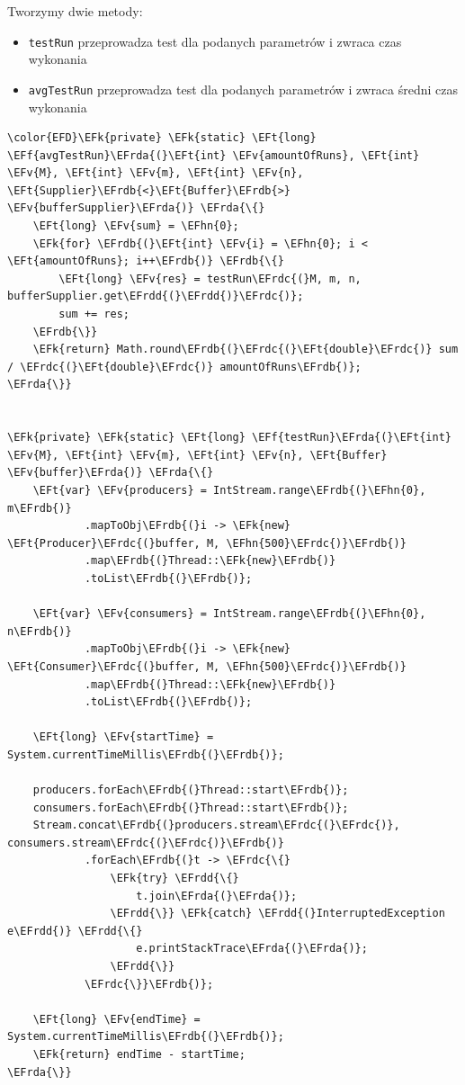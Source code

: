 \documentclass[11pt]{article}
\newcommand{\EFk}[1]{\textcolor{EFk}{#1}} %
\newcommand{\EFf}[1]{\textcolor{EFf}{#1}} %
\newcommand{\EFv}[1]{\textcolor{EFv}{#1}} %
\newcommand{\EFt}[1]{\textcolor{EFt}{#1}} %
\newcommand{\EFhn}[1]{\textcolor{EFhn}{#1}} %
\newcommand{\EFrda}[1]{#1} %
\newcommand{\EFrdb}[1]{\textcolor{EFrdb}{#1}} %
\newcommand{\EFrdc}[1]{\textcolor{EFrdc}{#1}} %
\newcommand{\EFrdd}[1]{\textcolor{EFrdd}{#1}} %
\begin{document}
Tworzymy dwie metody:
\begin{itemize}
\item \texttt{testRun} przeprowadza test dla podanych parametrów i zwraca czas wykonania
\item \texttt{avgTestRun} przeprowadza test dla podanych parametrów i zwraca średni czas wykonania
\end{itemize}

\begin{Code}
\begin{Verbatim}
\color{EFD}\EFk{private} \EFk{static} \EFt{long} \EFf{avgTestRun}\EFrda{(}\EFt{int} \EFv{amountOfRuns}, \EFt{int} \EFv{M}, \EFt{int} \EFv{m}, \EFt{int} \EFv{n}, \EFt{Supplier}\EFrdb{<}\EFt{Buffer}\EFrdb{>} \EFv{bufferSupplier}\EFrda{)} \EFrda{\{}
    \EFt{long} \EFv{sum} = \EFhn{0};
    \EFk{for} \EFrdb{(}\EFt{int} \EFv{i} = \EFhn{0}; i < \EFt{amountOfRuns}; i++\EFrdb{)} \EFrdb{\{}
        \EFt{long} \EFv{res} = testRun\EFrdc{(}M, m, n, bufferSupplier.get\EFrdd{(}\EFrdd{)}\EFrdc{)};
        sum += res;
    \EFrdb{\}}
    \EFk{return} Math.round\EFrdb{(}\EFrdc{(}\EFt{double}\EFrdc{)} sum / \EFrdc{(}\EFt{double}\EFrdc{)} amountOfRuns\EFrdb{)};
\EFrda{\}}


\EFk{private} \EFk{static} \EFt{long} \EFf{testRun}\EFrda{(}\EFt{int} \EFv{M}, \EFt{int} \EFv{m}, \EFt{int} \EFv{n}, \EFt{Buffer} \EFv{buffer}\EFrda{)} \EFrda{\{}
    \EFt{var} \EFv{producers} = IntStream.range\EFrdb{(}\EFhn{0}, m\EFrdb{)}
            .mapToObj\EFrdb{(}i -> \EFk{new} \EFt{Producer}\EFrdc{(}buffer, M, \EFhn{500}\EFrdc{)}\EFrdb{)}
            .map\EFrdb{(}Thread::\EFk{new}\EFrdb{)}
            .toList\EFrdb{(}\EFrdb{)};

    \EFt{var} \EFv{consumers} = IntStream.range\EFrdb{(}\EFhn{0}, n\EFrdb{)}
            .mapToObj\EFrdb{(}i -> \EFk{new} \EFt{Consumer}\EFrdc{(}buffer, M, \EFhn{500}\EFrdc{)}\EFrdb{)}
            .map\EFrdb{(}Thread::\EFk{new}\EFrdb{)}
            .toList\EFrdb{(}\EFrdb{)};

    \EFt{long} \EFv{startTime} = System.currentTimeMillis\EFrdb{(}\EFrdb{)};

    producers.forEach\EFrdb{(}Thread::start\EFrdb{)};
    consumers.forEach\EFrdb{(}Thread::start\EFrdb{)};
    Stream.concat\EFrdb{(}producers.stream\EFrdc{(}\EFrdc{)}, consumers.stream\EFrdc{(}\EFrdc{)}\EFrdb{)}
            .forEach\EFrdb{(}t -> \EFrdc{\{}
                \EFk{try} \EFrdd{\{}
                    t.join\EFrda{(}\EFrda{)};
                \EFrdd{\}} \EFk{catch} \EFrdd{(}InterruptedException e\EFrdd{)} \EFrdd{\{}
                    e.printStackTrace\EFrda{(}\EFrda{)};
                \EFrdd{\}}
            \EFrdc{\}}\EFrdb{)};

    \EFt{long} \EFv{endTime} = System.currentTimeMillis\EFrdb{(}\EFrdb{)};
    \EFk{return} endTime - startTime;
\EFrda{\}}
\end{Verbatim}
\end{Code}
\end{document}
